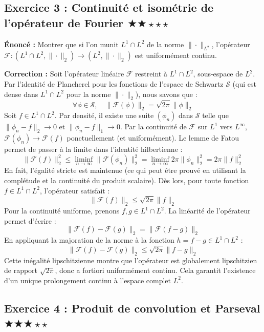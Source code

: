 \documentclass[11pt,a4paper]{article}
\begin{document}
\subsection*{Exercice 3 : Continuité et isométrie de l'opérateur de Fourier \quad $\bigstar\bigstar\star\star\star$}

\textbf{Énoncé :}
Montrer que si l'on munit $L^1 \cap L^2$ de la norme $\|\cdot\|_{L^2}$, l'opérateur $\mathcal{F} : (L^1 \cap L^2, \|\cdot\|_2) \to (L^2, \|\cdot\|_2)$ est uniformément continu.

\textbf{Correction :}
Soit l'opérateur linéaire $\mathcal{F}$ restreint à $L^1 \cap L^2$, sous-espace de $L^2$.
Par l'identité de Plancherel pour les fonctions de l'espace de Schwartz $\mathcal{S}$ (qui est dense dans $L^1 \cap L^2$ pour la norme $\|\cdot\|_2$), nous savons que :
$$ \forall \phi \in \mathcal{S}, \quad \|\mathcal{F}(\phi)\|_2 = \sqrt{2\pi} \|\phi\|_2 $$
Soit $f \in L^1 \cap L^2$. Par densité, il existe une suite $(\phi_n)$ dans $\mathcal{S}$ telle que $\|\phi_n - f\|_2 \to 0$ et $\|\phi_n - f\|_1 \to 0$.
Par la continuité de $\mathcal{F}$ sur $L^1$ vers $L^\infty$, $\mathcal{F}(\phi_n) \to \mathcal{F}(f)$ ponctuellement (et uniformément).
Le lemme de Fatou permet de passer à la limite dans l'identité hilbertienne :
$$ \|\mathcal{F}(f)\|_2^2 \le \liminf_{n \to \infty} \|\mathcal{F}(\phi_n)\|_2^2 = \liminf_{n \to \infty} 2\pi \|\phi_n\|_2^2 = 2\pi \|f\|_2^2 $$
En fait, l'égalité stricte est maintenue (ce qui peut être prouvé en utilisant la complétude et la continuité du produit scalaire).
Dès lors, pour toute fonction $f \in L^1 \cap L^2$, l'opérateur satisfait :
$$ \|\mathcal{F}(f)\|_2 \le \sqrt{2\pi} \|f\|_2 $$
Pour la continuité uniforme, prenons $f, g \in L^1 \cap L^2$.
La linéarité de l'opérateur permet d'écrire :
$$ \|\mathcal{F}(f) - \mathcal{F}(g)\|_2 = \|\mathcal{F}(f - g)\|_2 $$
En appliquant la majoration de la norme à la fonction $h = f - g \in L^1 \cap L^2$ :
$$ \|\mathcal{F}(f) - \mathcal{F}(g)\|_2 \le \sqrt{2\pi} \|f - g\|_2 $$
Cette inégalité lipschitzienne montre que l'opérateur est globalement lipschitzien de rapport $\sqrt{2\pi}$, donc a fortiori uniformément continu. Cela garantit l'existence d'un unique prolongement continu à l'espace complet $L^2$.



\subsection*{Exercice 4 : Produit de convolution et Parseval \quad $\bigstar\bigstar\bigstar\star\star$}
\end{document}
